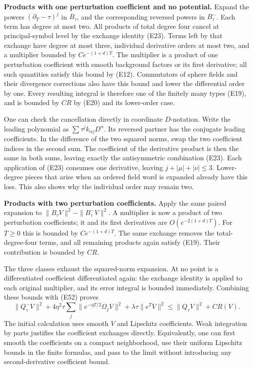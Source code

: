 \documentclass[
  11pt,
]{article}
\begin{document}
\textbf{Products with one perturbation coefficient and no potential.}
Expand the powers \((\partial_T-\tau)^j\) in \(B_\tau\), and the
corresponding reversed powers in \(B_\tau^-\). Each term has degree at
most two. All products of total degree four cancel at principal-symbol
level by the exchange identity (E23). Terms left by that exchange have
degree at most three, individual derivative orders at most two, and a
multiplier bounded by \(Ce^{-(1+d)T}\). The multiplier is a product of
one perturbation coefficient with smooth background factors or its first
derivative; all such quantities satisfy this bound by (E12). Commutators
of sphere fields and their divergence corrections also have this bound
and lower the differential order by one. Every resulting integral is
therefore one of the finitely many types (E19), and is bounded by \(CR\)
by (E20) and its lower-order case.

One can check the cancellation directly in coordinate \(D\)-notation.
Write the leading polynomial as \(\sum \tau^j k_{\alpha j}D^\alpha\).
Its reversed partner has the conjugate leading coefficients. In the
difference of the two squared norms, swap the two coefficient indices in
the second sum. The coefficient of the derivative product is then the
same in both sums, leaving exactly the antisymmetric combination (E23).
Each application of (E23) consumes one derivative, leaving
\(j+|\mu|+|\nu|\leq3\). Lower-degree pieces that arise when an ordered
field word is expanded already have this loss. This also shows why the
individual order may remain two.

\textbf{Products with two perturbation coefficients.} Apply the same
paired expansion to \(\|B_\tau V\|^2-\|B_\tau^-V\|^2\). A multiplier is
now a product of two perturbation coefficients; it and its first
derivatives are \(O(e^{-2(1+d)T})\). For \(T\geq0\) this is bounded by
\(Ce^{-(1+d)T}\). The same exchange removes the total-degree-four terms,
and all remaining products again satisfy (E19). Their contribution is
bounded by \(CR\).

The three classes exhaust the squared-norm expansion. At no point is a
differentiated coefficient differentiated again: the exchange identity
is applied to each original multiplier, and its error integral is
bounded immediately. Combining these bounds with (E52) proves \[
 \|Q_\tau^-V\|^2
   +4\eta^2\tau\sum_j\|e^{-\eta T/2}\Omega_jV\|^2
   +\lambda\tau\|e^TV\|^2
                         \leq\|Q_\tau V\|^2+CR(V).             \tag{E55}
\] The initial calculation uses smooth \(V\) and Lipschitz coefficients.
Weak integration by parts justifies the coefficient exchanges directly.
Equivalently, one can first smooth the coefficients on a compact
neighborhood, use their uniform Lipschitz bounds in the finite formulas,
and pass to the limit without introducing any second-derivative
coefficient bound.
\end{document}
